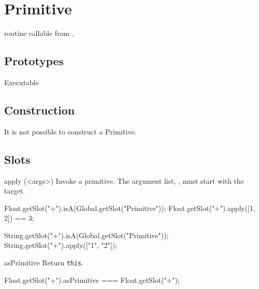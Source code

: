 
\section{Primitive}
\Cxx routine callable from \us.

\subsection{Prototypes}
\begin{refObjects}
\item[Executable]
\end{refObjects}

\subsection{Construction}

It is not possible to construct a Primitive.

\subsection{Slots}

\begin{urbiscriptapi}
\item[apply](<args>)%
  Invoke a primitive.  The argument list, , must start with
  the target.
\begin{urbiassert}
Float.getSlot("+").isA(Global.getSlot("Primitive"));
Float.getSlot("+").apply([1, 2]) == 3;

String.getSlot("+").isA(Global.getSlot("Primitive"));
String.getSlot("+").apply(["1", "2"]);
\end{urbiassert}

\item[asPrimitive] Return \lstinline|this|.
\begin{urbiassert}
Float.getSlot("+").asPrimitive === Float.getSlot("+");
\end{urbiassert}
\end{urbiscriptapi}


